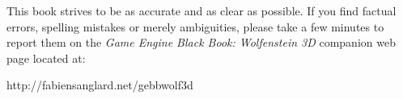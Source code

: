 This book strives to be as accurate and as clear as possible. If you find factual errors, spelling mistakes or merely ambiguities, please take a few minutes to report them on the \textit{Game Engine Black Book: Wolfenstein 3D} companion web page located at:\\
\par
http://fabiensanglard.net/gebbwolf3d